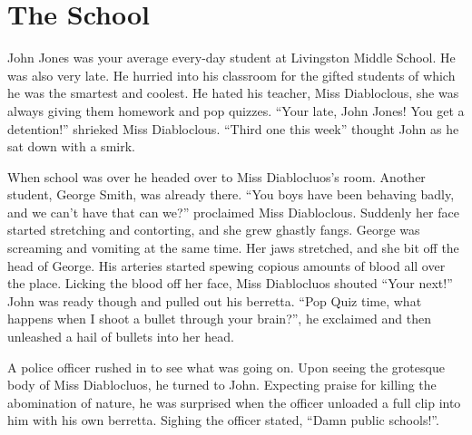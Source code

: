 \chapter{The School}


John Jones was your average every-day student at Livingston Middle
School. He was also very late. He hurried into his classroom for
the gifted students of which he was the smartest and coolest. He
hated his teacher, Miss Diabloclous, she was always giving them
homework and pop quizzes. ``Your late, John Jones! You get a
detention!'' shrieked Miss Diabloclous. ``Third one this
week'' thought John as he sat down with a smirk.



When school was over he headed over to Miss Diablocluos's
room. Another student, George Smith, was already there. ``You
boys have been behaving badly, and we can't have that can
we?'' proclaimed Miss Diabloclous. Suddenly her face started
stretching and contorting, and she grew ghastly fangs. George was
screaming and vomiting at the same time. Her jaws stretched, and
she bit off the head of George. His arteries started spewing
copious amounts of blood all over the place. Licking the blood off
her face, Miss Diablocluos shouted ``Your next!'' John
was ready though and pulled out his berretta. ``Pop Quiz time,
what happens when I shoot a bullet through your brain?'', he
exclaimed and then unleashed a hail of bullets into her head.



A police officer rushed in to see what was going on. Upon seeing
the grotesque body of Miss Diablocluos, he turned to John.
Expecting praise for killing the abomination of nature, he was
surprised when the officer unloaded a full clip into him with his
own berretta. Sighing the officer stated, ``Damn public
schools!''. 
 



